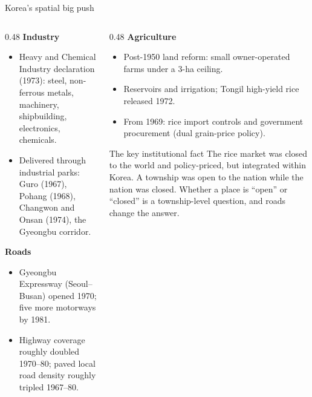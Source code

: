 \documentclass[10pt,aspectratio=169]{beamer}
\newcommand{\hl}[1]{\textcolor{mOrange}{#1}}
\begin{document}
\begin{frame}{Korea's spatial big push}
  \begin{columns}[T]
    \begin{column}{0.48\textwidth}
      \textbf{Industry}
      \begin{itemize}\footnotesize
        \item Heavy and Chemical Industry declaration (1973): steel, non-ferrous metals,
              machinery, shipbuilding, electronics, chemicals.
        \item Delivered through industrial parks: Guro (1967), Pohang (1968), Changwon
              and Onsan (1974), the Gyeongbu corridor.
      \end{itemize}
      \textbf{Roads}
      \begin{itemize}\footnotesize
        \item Gyeongbu Expressway (Seoul--Busan) opened 1970; five more motorways by 1981.
        \item Highway coverage roughly doubled 1970--80; paved local road density roughly
              tripled 1967--80.
      \end{itemize}
    \end{column}
    \begin{column}{0.48\textwidth}
      \textbf{Agriculture}
      \begin{itemize}\footnotesize
        \item Post-1950 land reform: small owner-operated farms under a 3-ha ceiling.
        \item Reservoirs and irrigation; Tongil high-yield rice released 1972.
        \item From 1969: rice import controls and government procurement (dual grain-price
              policy).
      \end{itemize}
      \begin{alertblock}{The key institutional fact}
        \footnotesize
        The rice market was \hl{closed to the world} and policy-priced, but
        \hl{integrated within Korea}. A township was open to the nation while the nation
        was closed. Whether a place is ``open'' or ``closed'' is a township-level question,
        and roads change the answer.
      \end{alertblock}
    \end{column}
  \end{columns}
\end{frame}
\end{document}
